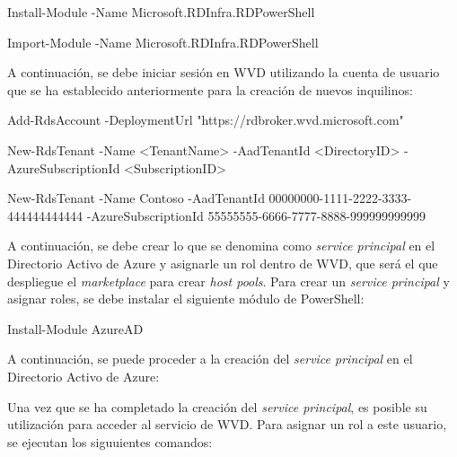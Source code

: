 \begin{console}
    Install-Module -Name Microsoft.RDInfra.RDPowerShell
\end{console} %

\begin{console}
    Import-Module -Name Microsoft.RDInfra.RDPowerShell
\end{console} %

A continuación, se debe iniciar sesión en \acs{WVD} utilizando la cuenta de usuario que se ha establecido anteriormente para la creación de nuevos inquilinos:

\begin{console}
    Add-RdsAccount -DeploymentUrl "https://rdbroker.wvd.microsoft.com"
\end{console} %

\begin{console}
    New-RdsTenant -Name <TenantName> -AadTenantId <DirectoryID> -AzureSubscriptionId <SubscriptionID>
\end{console} %

\begin{console}
    New-RdsTenant -Name Contoso -AadTenantId 00000000-1111-2222-3333-444444444444 -AzureSubscriptionId 55555555-6666-7777-8888-999999999999
\end{console} %

A continuación, se debe crear lo que se denomina como \textit{service principal} en el Directorio Activo de Azure y asignarle un rol dentro de \acs{WVD}, que será el que despliegue el \textit{marketplace} para crear \textit{host pools}. Para crear un \textit{service principal} y asignar roles, se debe instalar el siguiente módulo de PowerShell:

\begin{console}
    Install-Module AzureAD
\end{console} %

A continuación, se puede proceder a la creación del \textit{service principal} en el Directorio Activo de Azure:


Una vez que se ha completado la creación del \textit{service principal}, es posible su utilización para acceder al servicio de \acs{WVD}. Para asignar un rol a este usuario, se ejecutan los siguuientes comandos:

